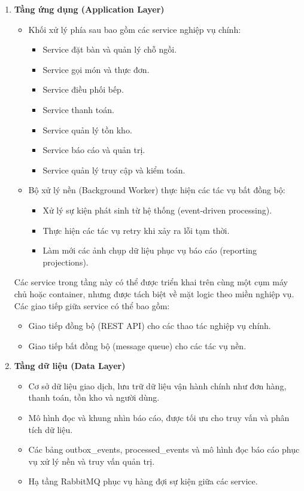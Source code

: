 \begin{enumerate}
  \item \textbf{Tầng ứng dụng (Application Layer)}
  \begin{itemize}
    \item Khối xử lý phía sau bao gồm các service nghiệp vụ chính:
    \begin{itemize}
      \item Service đặt bàn và quản lý chỗ ngồi.
      \item Service gọi món và thực đơn.
      \item Service điều phối bếp.
      \item Service thanh toán.
      \item Service quản lý tồn kho.
      \item Service báo cáo và quản trị.
      \item Service quản lý truy cập và kiểm toán.
    \end{itemize}

    \item Bộ xử lý nền (Background Worker) thực hiện các tác vụ bất đồng bộ:
    \begin{itemize}
      \item Xử lý sự kiện phát sinh từ hệ thống (event-driven processing).
      \item Thực hiện các tác vụ retry khi xảy ra lỗi tạm thời.
      \item Làm mới các ảnh chụp dữ liệu phục vụ báo cáo (reporting projections).
    \end{itemize}
  \end{itemize}

  Các service trong tầng này có thể được triển khai trên cùng một cụm máy chủ hoặc container, nhưng được tách biệt về mặt logic theo miền nghiệp vụ. Các giao tiếp giữa service có thể bao gồm:
  \begin{itemize}
    \item Giao tiếp đồng bộ (REST API) cho các thao tác nghiệp vụ chính.
    \item Giao tiếp bất đồng bộ (message queue) cho các tác vụ nền.
  \end{itemize}

  \item \textbf{Tầng dữ liệu (Data Layer)}
  \begin{itemize}
    \item Cơ sở dữ liệu giao dịch, lưu trữ dữ liệu vận hành chính như đơn hàng, thanh toán, tồn kho và người dùng.
    \item Mô hình đọc và khung nhìn báo cáo, được tối ưu cho truy vấn và phân tích dữ liệu.
    \item Các bảng \textsf{outbox\_events}, \textsf{processed\_events} và mô hình đọc báo cáo phục vụ xử lý nền và truy vấn quản trị.
    \item Hạ tầng \textsf{RabbitMQ} phục vụ hàng đợi sự kiện giữa các service.
  \end{itemize}


\end{enumerate}
